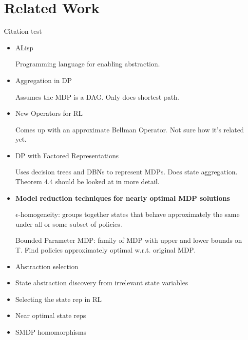 \documentclass{article}
\begin{document}
\section{Related Work}

Citation test~\cite{li2006towards}

\begin{itemize}
\item ALisp~\cite{andre2002state}

Programming language for enabling abstraction.

\item Aggregation in DP~\cite{Bean2011}

Assumes the MDP is a DAG. Only does shortest path.

\item New Operators for RL~\cite{Bellemare2015}

Comes up with an approximate Bellman Operator. Not sure how it's related yet.

\item DP with Factored Representations~\cite{Boutilier2000}

Uses decision trees and DBNs to represent MDPs. Does state aggregation. Theorem 4.4 should be looked at in more detail.

\item {\bf Model reduction techniques for nearly optimal MDP solutions}~\cite{dean1997model}

$\epsilon$-homogeneity: groups together states that behave approximately the same under all or some subset of policies.

Bounded Parameter MDP: family of MDP with upper and lower bounds on T. Find policies approximately optimal w.r.t. original MDP.

\item Abstraction selection~\cite{jiang2015abstraction}

\item State abstraction discovery from irrelevant state variables~\cite{jong2005state}

\item Selecting the state rep in RL~\cite{maillard2011selecting}

\item Near optimal state reps~\cite{ortner2014selecting}

\item SMDP homomorphisms~\cite{ravindran2003smdp}

\end{itemize}
\end{document}

